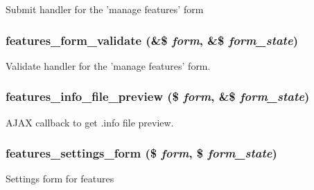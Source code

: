Submit handler for the 'manage features' form \hypertarget{features_8admin_8inc_a1017a5ace13ebdae60df70e4c6a8a07b}{
\subsubsection[{features\_\-form\_\-validate}]{\setlength{\rightskip}{0pt plus 5cm}features\_\-form\_\-validate (\&\$ {\em form}, \/  \&\$ {\em form\_\-state})}}
\label{features_8admin_8inc_a1017a5ace13ebdae60df70e4c6a8a07b}
Validate handler for the 'manage features' form. \hypertarget{features_8admin_8inc_ae0ae3dedd9038d99255ca4ba04ed4263}{
\subsubsection[{features\_\-info\_\-file\_\-preview}]{\setlength{\rightskip}{0pt plus 5cm}features\_\-info\_\-file\_\-preview (\$ {\em form}, \/  \&\$ {\em form\_\-state})}}
\label{features_8admin_8inc_ae0ae3dedd9038d99255ca4ba04ed4263}
AJAX callback to get .info file preview. \hypertarget{features_8admin_8inc_a13fe0f65db94a521da4528594b4b6a04}{
\subsubsection[{features\_\-settings\_\-form}]{\setlength{\rightskip}{0pt plus 5cm}features\_\-settings\_\-form (\$ {\em form}, \/  \$ {\em form\_\-state})}}
\label{features_8admin_8inc_a13fe0f65db94a521da4528594b4b6a04}
Settings form for features 